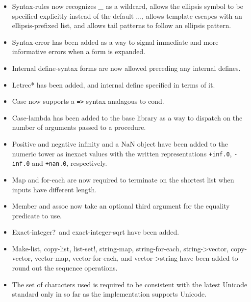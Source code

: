 \begin{itemize}
\item {\cf Syntax-rules} now recognizes {\em \_} as a wildcard, allows
the ellipsis symbol to be specified explicitly instead of the default
{\cf ...}, allows template escapes with an ellipsis-prefixed list, and
allows tail patterns to follow an ellipsis pattern.

\item {\cf Syntax-error} has been added as a way to signal immediate
and more informative errors when a form is expanded.

\item Internal {\cf define-syntax} forms are now allowed preceding any
internal {\cf define}s.

\item {\cf Letrec*} has been added, and internal define specified in
terms of it.

\item {\cf Case} now supports a {\tt =>} syntax analagous to {\cf cond}.

\item {\cf Case-lambda} has been added to the base library as a way to
dispatch on the number of arguments passed to a procedure.

\item Positive and negative infinity and a NaN object have been added
to the numeric tower as inexact values with the written
representations {\tt +inf.0}, {\tt -inf.0} and {\tt +nan.0},
respectively.

\item {\cf Map} and {\cf for-each} are now required to terminate on
the shortest list when inputs have different length.

\item {\cf Member} and {\cf assoc} now take an optional third argument
for the equality predicate to use.

\item {\cf Exact-integer?}\  and {\cf exact-integer-sqrt} have been added.

\item {\cf Make-list}, {\cf copy-list}, {\cf list-set!}, {\cf
string-map}, {\cf string-for-each}, {\cf string->vector}, {\cf
copy-vector}, {\cf vector-map}, {\cf vector-for-each}, and {\cf
vector->string} have been added to round out the sequence operations.

\item The set of characters used is required to be consistent with the
latest Unicode standard only in so far as the implementation supports
Unicode.


\end{itemize}
